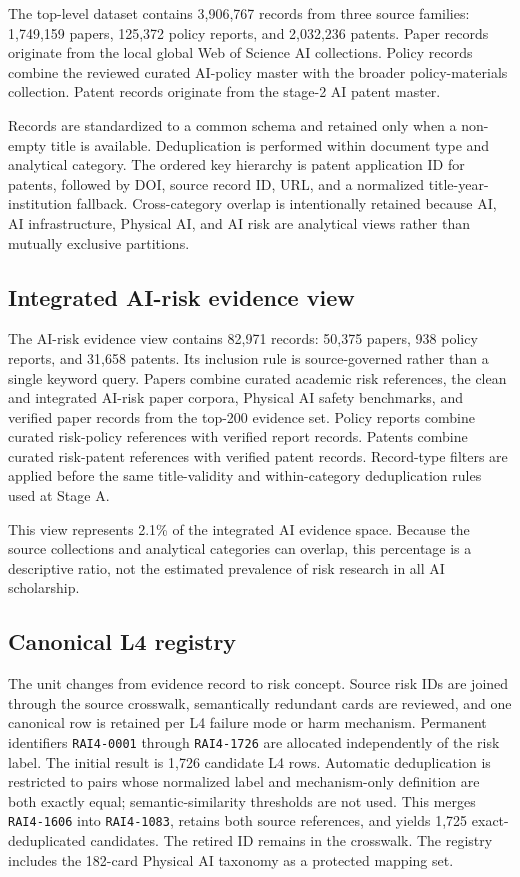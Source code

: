 \documentclass[11pt,a4paper]{article}
\newcommand{\code}[1]{\texttt{#1}}
\begin{document}
The top-level dataset contains 3,906,767 records from three source families:
1,749,159 papers, 125,372 policy reports, and 2,032,236 patents. Paper records
originate from the local global Web of Science AI collections. Policy records
combine the reviewed curated AI-policy master with the broader policy-materials
collection. Patent records originate from the stage-2 AI patent master.

Records are standardized to a common schema and retained only when a non-empty
title is available. Deduplication is performed within document type and
analytical category. The ordered key hierarchy is patent application ID for
patents, followed by DOI, source record ID, URL, and a normalized
title-year-institution fallback. Cross-category overlap is intentionally
retained because AI, AI infrastructure, Physical AI, and AI risk are analytical
views rather than mutually exclusive partitions.

\subsection{Integrated AI-risk evidence view}

The AI-risk evidence view contains 82,971 records: 50,375 papers, 938 policy
reports, and 31,658 patents. Its inclusion rule is source-governed rather than a
single keyword query. Papers combine curated academic risk references, the
clean and integrated AI-risk paper corpora, Physical AI safety benchmarks, and
verified paper records from the top-200 evidence set. Policy reports combine
curated risk-policy references with verified report records. Patents combine
curated risk-patent references with verified patent records. Record-type filters
are applied before the same title-validity and within-category deduplication
rules used at Stage A.

This view represents 2.1\% of the integrated AI evidence space. Because the
source collections and analytical categories can overlap, this percentage is a
descriptive ratio, not the estimated prevalence of risk research in all AI
scholarship.

\subsection{Canonical L4 registry}

The unit changes from evidence record to risk concept. Source risk IDs are
joined through the source crosswalk, semantically redundant cards are reviewed,
and one canonical row is retained per L4 failure mode or harm mechanism.
Permanent identifiers \code{RAI4-0001} through \code{RAI4-1726} are allocated
independently of the risk label. The initial result is 1,726 candidate L4 rows. Automatic
deduplication is restricted to pairs whose normalized label and mechanism-only
definition are both exactly equal; semantic-similarity thresholds are not used.
This merges \code{RAI4-1606} into \code{RAI4-1083}, retains both source references,
and yields 1,725 exact-deduplicated candidates. The retired ID remains in the
crosswalk. The registry includes the 182-card Physical AI taxonomy as a
protected mapping set.
\end{document}
